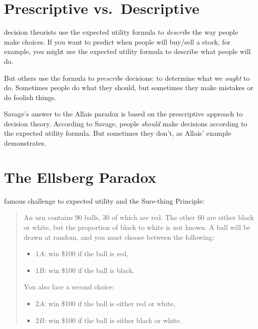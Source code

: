 \documentclass[justified]{tufte-book}
\providecommand{\tightlist}{%
  \setlength{\itemsep}{0pt}\setlength{\parskip}{0pt}}
\newenvironment{puzzle}{\begin{quote}\normalsize}{\end{quote}}
\theoremstyle{definition}
\theoremstyle{definition}
\theoremstyle{definition}
\theoremstyle{remark}
\begin{document}
\hypertarget{prescriptive-vs.descriptive}{%
\section{Prescriptive
vs.~Descriptive}\label{prescriptive-vs.descriptive}}

 decision theorists use the expected utility formula to
\emph{describe} the way people make choices. If you want to predict when
people will buy/sell a stock, for example, you might use the expected
utility formula to describe what people will do.

But others use the formula to \emph{prescribe} decisions: to determine
what we \emph{ought} to do. Sometimes people do what they should, but
sometimes they make mistakes or do foolish things.

Savage's answer to the Allais paradox is based on the prescriptive
approach to decision theory. According to Savage, people \emph{should}
make decisions according to the expected utility formula. But sometimes
they don't, as Allais' example demonstrates.

\hypertarget{the-ellsberg-paradox}{%
\section{The Ellsberg Paradox}\label{the-ellsberg-paradox}}

 famous challenge to expected utility and the
Sure-thing Principle:

\begin{puzzle}
An urn contains \(90\) balls, \(30\) of which are red. The other \(60\)
are either black or white, but the proportion of black to white is not
known. A ball will be drawn at random, and you must choose between the
following:

\begin{itemize}
\tightlist
\item
  \(1A\): win \$100 if the ball is red,
\item
  \(1B\): win \$100 if the ball is black.
\end{itemize}

You also face a second choice:

\begin{itemize}
\tightlist
\item
  \(2A\): win \$100 if the ball is either red or white,
\item
  \(2B\): win \$100 if the ball is either black or white.
\end{itemize}
\end{puzzle}
\end{document}
